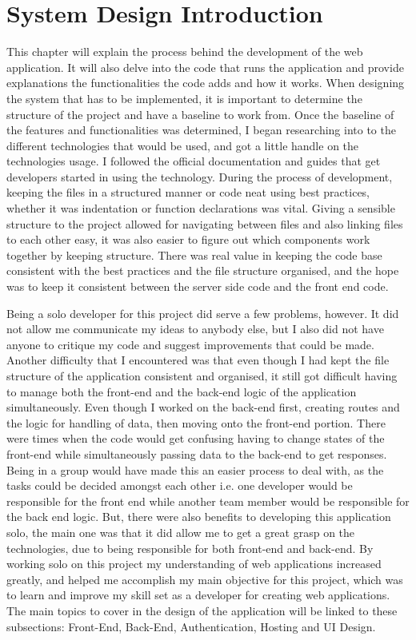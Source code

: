 \section{System Design Introduction}
This chapter will explain the process behind the development of the web application. It will also delve into the code that runs the application and provide explanations the functionalities the code adds and how it works. When designing the system that has to be implemented, it is important to determine the structure of the project and have a baseline to work from. Once the baseline of the features and functionalities was determined, I began researching into to the different technologies that would be used, and got a little handle on the technologies usage. I followed the official documentation and guides that get developers started in using the technology. During the process of development, keeping the files in a structured manner or code neat using best practices, whether it was indentation or function declarations was vital. Giving a sensible structure to the project allowed for navigating between files and also linking files to each other easy, it was also easier to figure out which components work together by keeping structure. There was real value in keeping the code base consistent with the best practices and the file structure organised, and the hope was to keep it consistent between the server side code and the front end code. 

Being a solo developer for this project did serve a few problems, however. It did not allow me communicate my ideas to anybody else, but I also did not have anyone to critique my code and suggest improvements that could be made. Another difficulty that I encountered was that even though I had kept the file structure of the application consistent and organised, it still got difficult having to manage both the front-end and the back-end logic of the application simultaneously. Even though I worked on the back-end first, creating routes and the logic for handling of data, then moving onto the front-end portion. There were times when the code would get confusing having to change states of the front-end while simultaneously passing data to the back-end to get responses. Being in a group would have made this an easier process to deal with, as the tasks could be decided amongst each other i.e. one developer would be responsible for the front end while another team member would be responsible for the back end logic. But, there were also benefits to developing this application solo, the main one was that it did allow me to get a great grasp on the technologies, due to being responsible for both front-end and back-end. By working solo on this project my understanding of web applications increased greatly, and helped me accomplish my main objective for this project, which was to learn and improve my skill set as a developer for creating web applications. The main topics to cover in the design of the application will be linked to these subsections: Front-End, Back-End, Authentication, Hosting and UI Design.

